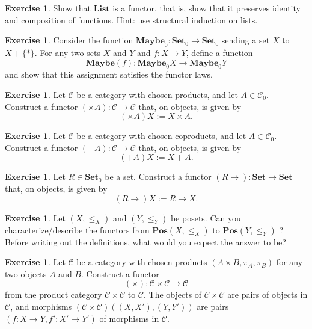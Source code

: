 \documentclass[a4paper,10pt]{scrartcl}
\theoremstyle{plain}
\theoremstyle{definition}
\newtheorem{exer}[thm]{Exercise}
\newcommand{\Cat}[1]{\mathcal{#1}}
\newcommand{\CC}{\Cat{C}}
\newcommand{\Catb}[1]{\mathbf{#1}}
\newcommand{\List}{\Catb{List}}
\newcommand{\Maybe}{\Catb{Maybe}}
\newcommand{\SET}{\Catb{Set}}
\newcommand{\POS}{\Catb{Pos}}
\newcommand{\Ob}[1]{{#1}_0}
\newcommand{\CHom}[3]{{#1}(#2,#3)}
\begin{document}
\begin{exer}
  Show that $\List$ is a  functor, that is, show that it preserves identity and composition of functions.
  Hint: use structural induction on lists.
\end{exer}

\begin{exer}
  Consider the function $\Ob{\Maybe} : \Ob\SET \to \Ob\SET$ sending a set $X$ to $X + \{*\}$.
  For any two sets $X$ and $Y$ and $f : X \to Y$, define a function
  \[ \Maybe(f) : \Ob\Maybe X \to \Ob\Maybe Y\]
  and show that this assignment satisfies the functor laws.
\end{exer}

\begin{exer}
  Let $\CC$ be a category with chosen products, and let $A \in \Ob\CC$.
  Construct a functor $(\times A) : \CC \to \CC$ that, on objects, is given by
  \[ (\times A) X := X \times A. \]
\end{exer}

\begin{exer}
  Let $\CC$ be a category with chosen coproducts, and let $A \in \Ob\CC$.
  Construct a functor $(+ A) : \CC \to \CC$ that, on objects, is given by
  \[ (+ A) X := X + A. \]
\end{exer}

\begin{exer}
  Let $R \in \Ob\SET$ be a set.
  Construct a functor $(R \to) : \SET \to \SET$ that, on objects, is given by
  \[ (R \to) X := R \to X. \]
\end{exer}



\begin{exer}\label{ex:poset_functors} Let $(X,\leq_X)$ and $(Y,\leq_Y)$ be posets. Can you characterize/describe the functors from $\POS(X,\leq_X)$ to $\POS(Y,\leq_Y)$  ? Before writing out the definitions, what would you expect the answer to be?
\end{exer}

\begin{exer}
  Let $\CC$ be a category with chosen products $(A\times B, \pi_A, \pi_B)$ for any two objects $A$ and $B$.
  Construct a functor
  \[ (\times) : \CC\times \CC \to \CC\]
  from the product category $\CC\times \CC$ to $\CC$.
  The objects of $\CC\times \CC$ are pairs of objects in $\CC$, and morphisms $\CHom{(\CC\times\CC)}{(X,X')}{(Y,Y')}$ are pairs $(f : X \to Y, f' : X' \to Y')$ of morphisms in $\CC$.
\end{exer}
\end{document}

